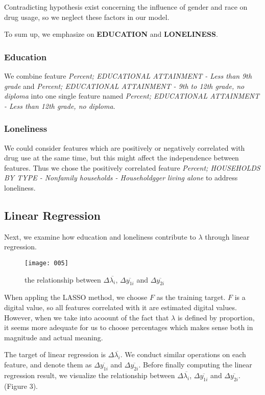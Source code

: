 Contradicting hypothesis exist concerning the influence of gender and race on drug usage, so we neglect these factors in our model.

To sum up, we emphasize on \textbf{EDUCATION} and \textbf{LONELINESS}. 
\subsubsection{Education}
We combine feature \textit{Percent; EDUCATIONAL ATTAINMENT - Less than 9th grade} and \textit{Percent; EDUCATIONAL ATTAINMENT - 9th to 12th grade, no diploma} into one single feature named \textit{Percent; EDUCATIONAL ATTAINMENT - Less than 12th grade, no diploma}.
\subsubsection{Loneliness}
We could consider features which are positively or negatively correlated with drug use at the same time, but this might affect the independence between features. Thus we chose the positively correlated feature \textit{Percent; HOUSEHOLDS BY TYPE - Nonfamily households - Householdgger living alone} to address loneliness.

\subsection{Linear Regression}
Next, we examine how education and loneliness contribute to $\lambda$ through linear regression.


\begin{wrapfigure}{r}{0.35\linewidth} %
	\begin{center}
		\texttt{[image: 005]}
	\end{center}
	\caption{the relationship between $\Delta \overline{\lambda_i}$, $\Delta \overline{y_{1i}}$ and  $\Delta \overline{y_{2i}}$}
\end{wrapfigure}


When appling the LASSO method, we choose $F$ as the training target. $F$ is a digital value, so all features correlated with it are estimated digital values. However, when we take into acoount of the fact that $\lambda$ is defined by proportion, it seems more adequate for us to choose percentages which makes sense both in magnitude and actual meaning.


The target of linear regression is $\Delta \overline{\lambda_i}$. We conduct similar operations on each feature, and denote them as $\Delta \overline{y_{1i}}$ and  $\Delta \overline{y_{2i}}$. Before finally computing the linear regression result, we visualize the relationship between $\Delta \overline{\lambda_i}$, $\Delta \overline{y_{1i}}$ and  $\Delta \overline{y_{2i}}$.(Figure 3).

